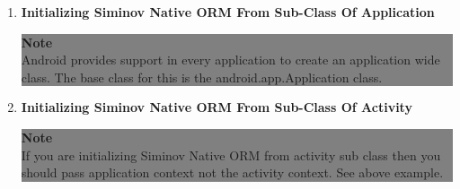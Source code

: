 \begin{enumerate}

	\item \small \textbf{Initializing Siminov Native ORM From Sub-Class Of Application}

		
	
		\begin{center}
			\colorbox{grey}{
				\parbox[t]{.8\linewidth}{
					\fontsize{11pt}{11pt}\selectfont %
					\vspace*{0.1cm} %
		
					\hfill \textbf{Note} \\

					Android provides support in every application to create an application wide class. The base class for this is the android.app.Application class. 

					\vspace*{0.0cm} %
				}
			}

		\end{center}

	\newpage
	\item \small \textbf{Initializing Siminov Native ORM From Sub-Class Of Activity}

		


		\begin{center}
			\colorbox{grey}{
				\parbox[t]{.8\linewidth}{
					\fontsize{11pt}{11pt}\selectfont %
					\vspace*{0.1cm} %
		
					\hfill \textbf{Note} \\

					If you are initializing Siminov Native ORM from activity sub class then you should pass application context not the activity context. See above example.

					\vspace*{0.0cm} %
				}
			}

		\end{center}


\end{enumerate}



